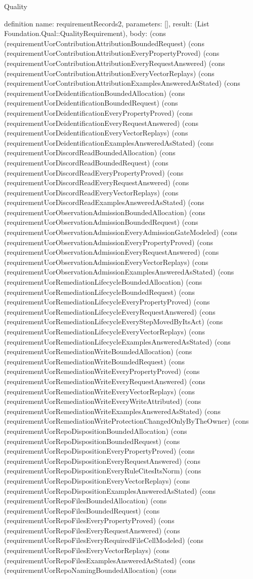 \begin{lexlean}{Quality}
\begin{semanticmodule}
definition{
  name: requirementRecords2,
  parameters: [],
  result: (List Foundation.Qual::QualityRequirement),
  body: (cons (requirementUorContributionAttributionBoundedRequest) (cons (requirementUorContributionAttributionEveryPropertyProved) (cons (requirementUorContributionAttributionEveryRequestAnswered) (cons (requirementUorContributionAttributionEveryVectorReplays) (cons (requirementUorContributionAttributionExamplesAnsweredAsStated) (cons (requirementUorDeidentificationBoundedAllocation) (cons (requirementUorDeidentificationBoundedRequest) (cons (requirementUorDeidentificationEveryPropertyProved) (cons (requirementUorDeidentificationEveryRequestAnswered) (cons (requirementUorDeidentificationEveryVectorReplays) (cons (requirementUorDeidentificationExamplesAnsweredAsStated) (cons (requirementUorDiscordReadBoundedAllocation) (cons (requirementUorDiscordReadBoundedRequest) (cons (requirementUorDiscordReadEveryPropertyProved) (cons (requirementUorDiscordReadEveryRequestAnswered) (cons (requirementUorDiscordReadEveryVectorReplays) (cons (requirementUorDiscordReadExamplesAnsweredAsStated) (cons (requirementUorObservationAdmissionBoundedAllocation) (cons (requirementUorObservationAdmissionBoundedRequest) (cons (requirementUorObservationAdmissionEveryAdmissionGateModeled) (cons (requirementUorObservationAdmissionEveryPropertyProved) (cons (requirementUorObservationAdmissionEveryRequestAnswered) (cons (requirementUorObservationAdmissionEveryVectorReplays) (cons (requirementUorObservationAdmissionExamplesAnsweredAsStated) (cons (requirementUorRemediationLifecycleBoundedAllocation) (cons (requirementUorRemediationLifecycleBoundedRequest) (cons (requirementUorRemediationLifecycleEveryPropertyProved) (cons (requirementUorRemediationLifecycleEveryRequestAnswered) (cons (requirementUorRemediationLifecycleEveryStepMovedByItsAct) (cons (requirementUorRemediationLifecycleEveryVectorReplays) (cons (requirementUorRemediationLifecycleExamplesAnsweredAsStated) (cons (requirementUorRemediationWriteBoundedAllocation) (cons (requirementUorRemediationWriteBoundedRequest) (cons (requirementUorRemediationWriteEveryPropertyProved) (cons (requirementUorRemediationWriteEveryRequestAnswered) (cons (requirementUorRemediationWriteEveryVectorReplays) (cons (requirementUorRemediationWriteEveryWriteAttributed) (cons (requirementUorRemediationWriteExamplesAnsweredAsStated) (cons (requirementUorRemediationWriteProtectionChangedOnlyByTheOwner) (cons (requirementUorRepoDispositionBoundedAllocation) (cons (requirementUorRepoDispositionBoundedRequest) (cons (requirementUorRepoDispositionEveryPropertyProved) (cons (requirementUorRepoDispositionEveryRequestAnswered) (cons (requirementUorRepoDispositionEveryRuleCitesItsNorm) (cons (requirementUorRepoDispositionEveryVectorReplays) (cons (requirementUorRepoDispositionExamplesAnsweredAsStated) (cons (requirementUorRepoFilesBoundedAllocation) (cons (requirementUorRepoFilesBoundedRequest) (cons (requirementUorRepoFilesEveryPropertyProved) (cons (requirementUorRepoFilesEveryRequestAnswered) (cons (requirementUorRepoFilesEveryRequiredFileCellModeled) (cons (requirementUorRepoFilesEveryVectorReplays) (cons (requirementUorRepoFilesExamplesAnsweredAsStated) (cons (requirementUorRepoNamingBoundedAllocation) (cons }
\end{semanticmodule}
\end{lexlean}
